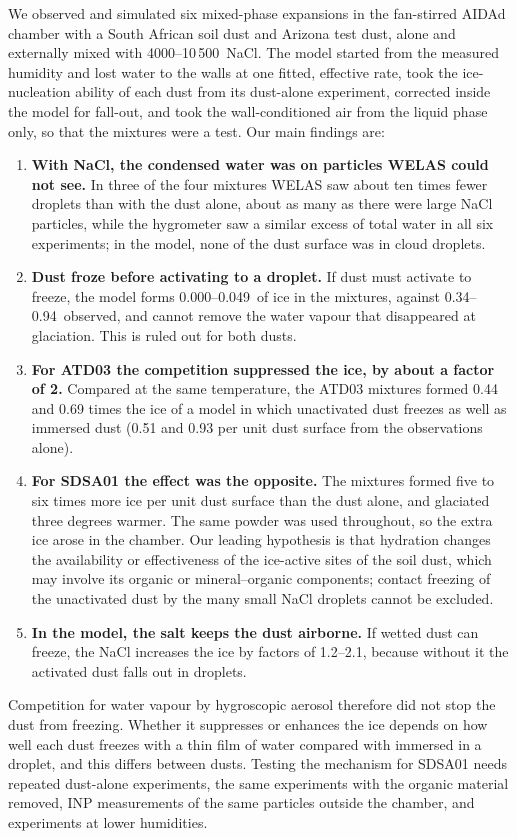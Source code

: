 \conclusions

We observed and simulated six mixed-phase expansions in the fan-stirred AIDAd chamber with a South African soil dust and Arizona test dust, alone and externally mixed with 4000--10\,500\cmc\ NaCl. The model started from the measured humidity and lost water to the walls at one fitted, effective rate, took the ice-nucleation ability of each dust from its dust-alone experiment, corrected inside the model for fall-out, and took the wall-conditioned air from the liquid phase only, so that the mixtures were a test. Our main findings are:
\begin{enumerate}
\item \textbf{With NaCl, the condensed water was on particles WELAS could not see.} In three of the four mixtures WELAS saw about ten times fewer droplets than with the dust alone, about as many as there were large NaCl particles, while the hygrometer saw a similar excess of total water in all six experiments; in the model, none of the dust surface was in cloud droplets.
\item \textbf{Dust froze before activating to a droplet.} If dust must activate to freeze, the model forms 0.000--0.049\cmc\ of ice in the mixtures, against 0.34--0.94\cmc\ observed, and cannot remove the water vapour that disappeared at glaciation. This is ruled out for both dusts.
\item \textbf{For ATD03 the competition suppressed the ice, by about a factor of 2.} Compared at the same temperature, the ATD03 mixtures formed 0.44 and 0.69 times the ice of a model in which unactivated dust freezes as well as immersed dust (0.51 and 0.93 per unit dust surface from the observations alone).
\item \textbf{For SDSA01 the effect was the opposite.} The mixtures formed five to six times more ice per unit dust surface than the dust alone, and glaciated three degrees warmer. The same powder was used throughout, so the extra ice arose in the chamber. Our leading hypothesis is that hydration changes the availability or effectiveness of the ice-active sites of the soil dust, which may involve its organic or mineral--organic components; contact freezing of the unactivated dust by the many small NaCl droplets cannot be excluded.
\item \textbf{In the model, the salt keeps the dust airborne.} If wetted dust can freeze, the NaCl increases the ice by factors of 1.2--2.1, because without it the activated dust falls out in droplets.
\end{enumerate}
Competition for water vapour by hygroscopic aerosol therefore did not stop the dust from freezing. Whether it suppresses or enhances the ice depends on how well each dust freezes with a thin film of water compared with immersed in a droplet, and this differs between dusts. Testing the mechanism for SDSA01 needs repeated dust-alone experiments, the same experiments with the organic material removed, INP measurements of the same particles outside the chamber, and experiments at lower humidities.

